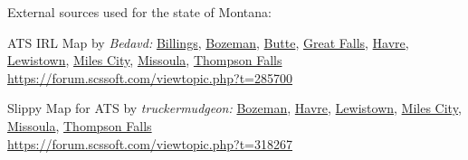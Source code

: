 


%
%







	\pagebreak

%



\vspace{2em}\footnoterule
{\footnotesize \noindent External sources used for the state of Montana:
\begin{description}[
	style=nextline,
	leftmargin=1.1em,
	labelsep=0pt,
	parsep=0pt,
	font=\normalfont,
]

\item[$\ast$]
ATS IRL Map by \textit{Bedavd:}
\hyperref[city:Billings]{Billings},
\hyperref[city:Bozeman]{Bozeman},
\hyperref[city:Butte]{Butte},
\hyperref[city:Great Falls]{Great Falls},
\hyperref[city:Havre]{Havre},
\hyperref[city:Lewistown]{Lewistown},
\hyperref[city:Miles City]{Miles City},
\hyperref[city:Missoula]{Missoula},
\hyperref[city:Thompson Falls]{Thompson Falls}
\\ \url{https://forum.scssoft.com/viewtopic.php?t=285700}

\item[$\dagger$]
Slippy Map for ATS by \textit{truckermudgeon:}
\hyperref[city:Bozeman]{Bozeman},
\hyperref[city:Havre]{Havre},
\hyperref[city:Lewistown]{Lewistown},
\hyperref[city:Miles City]{Miles City},
\hyperref[city:Missoula]{Missoula},
\hyperref[city:Thompson Falls]{Thompson Falls}
\\ \url{https://forum.scssoft.com/viewtopic.php?t=318267}

\end{description}
}
